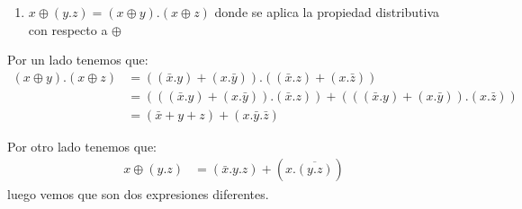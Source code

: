 \documentclass[12pt]{article}
\begin{document}
\begin{enumerate}[left=0pt, label=\alph*), leftmargin=*]
	\item $x \oplus (y.z) = (x \oplus y).(x \oplus z)$ donde se aplica la propiedad distributiva con respecto a $\oplus$
\end{enumerate}

Por un lado tenemos que:
\begin{align*}
	(x \oplus y).(x \oplus z) &= ((\bar x.y) + (x. \bar y)) . ((\bar x .z) + (x. \bar z)) \\
	&= (((\bar x . y) + (x . \bar y)). (\bar x . z)) + (((\bar x .y) + (x . \bar y)).(x. \bar z)) \\
	&= (\bar x + y + z) + (x . \bar y. \bar z)
\end{align*}

Por otro lado tenemos que:
\begin{align*}
	x \oplus (y.z) &= (\bar x . y . z) + (x . \overline{(y.z)})
\end{align*}
luego vemos que son dos expresiones diferentes.
\end{document}
